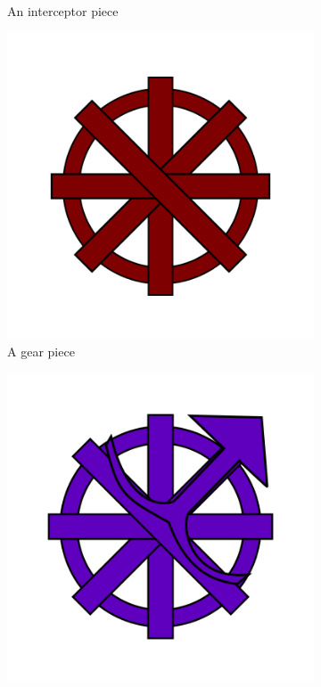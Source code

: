\documentclass{l4proj}
\begin{document}
\begin{figure}
\begin{subfigure}[b]{0.3\textwidth}
        \caption{An interceptor piece}
        \label{fig:interceptor}
    \end{subfigure}
    \begin{subfigure}[b]{0.3\textwidth}
        \includegraphics[width=1\textwidth]{images/gear.png}
        \caption{A gear piece}
        \label{fig:gear}
    \end{subfigure}
    \begin{subfigure}[b]{0.3\textwidth}
        \includegraphics[width=1\textwidth]{images/gear-bit.png}

\end{subfigure}
\end{figure}
\end{document}
